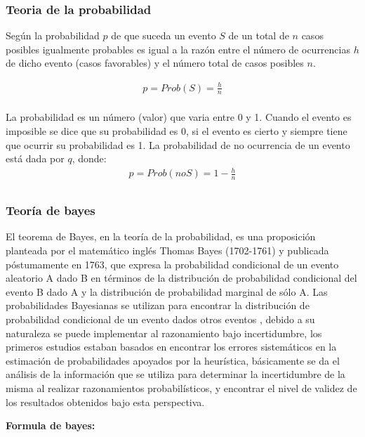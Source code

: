\subsubsection{Teoria de la probabilidad}

Según \citep{alvarez_rojas} la probabilidad \(p\) de que suceda un evento \(S\) de un total de \(n\) casos posibles igualmente probables es igual a la razón entre el número de ocurrencias \(h\) de dicho evento (casos favorables) y el número total de casos posibles \(n\).

\begin{align*}
p = Prob(S) = \frac{h}{n}\\
\end{align*}

La probabilidad es un número (valor) que varia entre 0 y 1. Cuando el evento es imposible se dice que su probabilidad es 0, si el evento es cierto y siempre tiene que ocurrir su probabilidad es 1.
La probabilidad de no ocurrencia de un evento está dada por \(q\), donde:
\begin{align*}
p = Prob(noS) = 1 - \frac{h}{n}\\
\end{align*}


\subsubsection{Teoría de bayes}

El teorema de Bayes, en la teoría de la probabilidad, es una proposición planteada por el matemático inglés Thomas Bayes (1702-1761) \citep{bayes} y publicada póstumamente en 1763, que expresa la probabilidad condicional de un evento aleatorio A dado B en términos de la distribución de probabilidad condicional del evento B dado A y la distribución de probabilidad marginal de sólo A.
\vskip 0.1cm 
Las probabilidades Bayesianas se utilizan para encontrar la distribución de probabilidad condicional de un evento dados otros eventos , debido a su naturaleza se puede implementar al razonamiento bajo incertidumbre, los primeros estudios estaban basados en encontrar los errores sistemáticos en la estimación de probabilidades apoyados por la heurística, básicamente se da el análisis de la información que se utiliza para determinar la incertidumbre de la misma al realizar razonamientos probabilísticos, y encontrar el nivel de validez de los resultados obtenidos bajo esta perspectiva.

{\bf Formula de bayes:}\par

